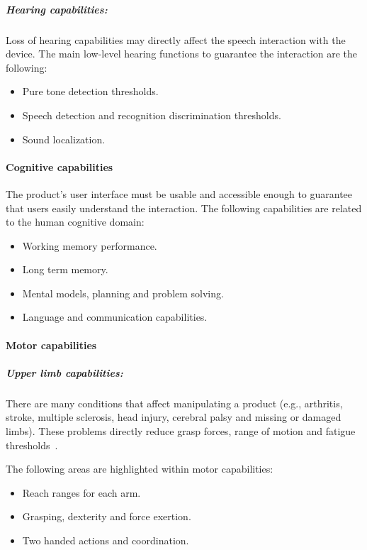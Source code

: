 \subparagraph*{Hearing capabilities:} Loss of hearing capabilities may directly 
affect the speech interaction with the device. The main low-level hearing 
functions to guarantee the interaction are the following:

\begin{itemize}
  \item Pure tone detection thresholds.
  \item Speech detection and recognition discrimination thresholds.
  \item Sound localization.
\end{itemize}


\paragraph*{Cognitive capabilities}
The product's user interface must be usable and accessible enough to guarantee 
that users easily understand the interaction. The following capabilities are 
related to the human cognitive domain:

\begin{itemize}
 \item Working memory performance.
 \item Long term memory.
 \item Mental models, planning and problem solving.
 \item Language and communication capabilities.
\end{itemize}

\paragraph*{Motor capabilities}
\subparagraph*{Upper limb capabilities:}
There are many conditions that affect manipulating a product (e.g., arthritis, 
stroke, multiple sclerosis, head injury, cerebral palsy and missing or damaged 
limbs). These problems directly reduce grasp forces, range of motion and fatigue 
thresholds~\cite{persad_characterising_2007}.

The following areas are highlighted within motor capabilities:
\begin{itemize}
  \item Reach ranges for each arm.
  \item Grasping, dexterity and force exertion.
  \item Two handed actions and coordination.
\end{itemize}

